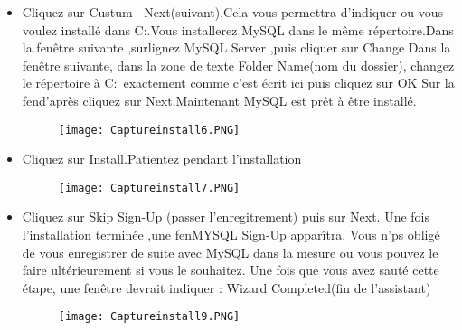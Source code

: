 \documentclass{beamer}
\begin{document}
 \begin{frame}
\begin{itemize}
    
     \item Cliquez sur Custum $\>$ Next(suivant).Cela vous permettra d'indiquer ou vous voulez installé dans C:\Server.Vous installerez MySQL dans le m\^eme r\'epertoire.Dans la fen\^etre suivante ,surlignez MySQL Server ,puis cliquer sur Change
     Dans la fen\^etre suivante, dans la zone de texte Folder Name(nom du dossier), changez le répertoire à C:\Server\MySQL\ exactement comme c'est écrit ici puis cliquez sur OK
     Sur la fen d'après cliquez sur Next.Maintenant MySQL est pr\^et à \^etre install\'e.
           \begin{figure}[h]
\centering	
 \texttt{[image: Captureinstall6.PNG]}
\end{figure}
     \end{itemize}
     
 \end{frame}
 \begin{frame}
\begin{itemize}
    
     \item Cliquez sur Install.Patientez pendant l'installation
           \begin{figure}[h]
\centering	
 \texttt{[image: Captureinstall7.PNG]}
\end{figure}
     \end{itemize}
     
 \end{frame}
 
 \begin{frame}
\begin{itemize}
    
     \item Cliquez sur Skip Sign-Up (passer l'enregitrement) puis sur Next. Une fois l'installation terminée ,une fen MYSQL Sign-Up appar\^itra. Vous n' ps oblig\'e de vous enregistrer de suite avec MySQL dans la mesure ou vous pouvez le faire ultérieurement si vous le souhaitez. Une fois que vous avez saut\'e cette \'etape, une fen\^etre devrait indiquer : Wizard Completed(fin de l'assistant)
           \begin{figure}[h]
\centering	
 \texttt{[image: Captureinstall9.PNG]}
\end{figure}
     \end{itemize}
     
 \end{frame}
 
\end{document}
